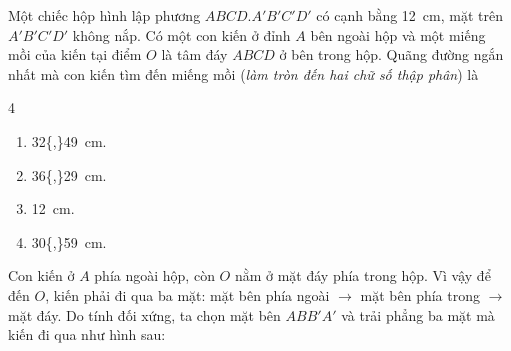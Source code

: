 \begin{baitap}
	Một chiếc hộp hình lập phương $ABCD.A'B'C'D'$ có cạnh bằng \qty{12}{\centi\meter}, mặt trên $A'B'C'D'$ không nắp. Có một con kiến ở đỉnh $A$ bên ngoài hộp và một miếng mồi của kiến tại điểm $O$ là tâm đáy $ABCD$ ở bên trong hộp. Quãng đường ngắn nhất mà con kiến tìm đến miếng mồi (\textit{làm tròn đến hai chữ số thập phân}) là
	\begin{multicols}{4}
		\begin{enumerate}
			\item \qty{32{,}49}{\centi\meter}.
			\item \qty{36{,}29}{\centi\meter}.
			\item \qty{12}{\centi\meter}.
			\item \qty{30{,}59}{\centi\meter}.
		\end{enumerate}
	\end{multicols}
	\begin{traloi}
		Con kiến ở \(A\) phía ngoài hộp, còn \(O\) nằm ở mặt đáy phía trong hộp. Vì vậy để đến \(O\), kiến phải đi qua ba mặt: mặt bên phía ngoài \(\to\) mặt bên phía trong \(\to\) mặt đáy.  Do tính đối xứng, ta chọn mặt bên \(ABB'A'\) và trải phẳng ba mặt mà kiến đi qua như hình sau:
			\begin{center}
\end{center}
\end{traloi}
\end{baitap}
